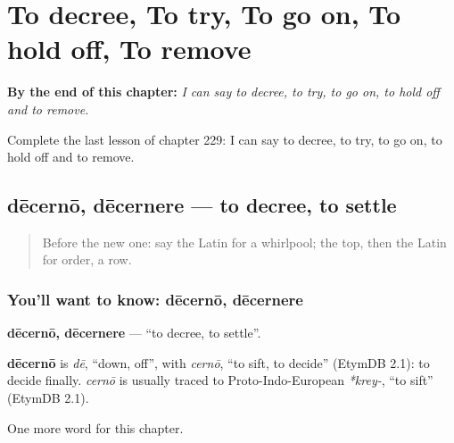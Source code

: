 
\chapter{To decree, To try, To go on, To hold off, To remove}
\label{ch:la-to-decree-to-try-to-go-on-to-hold-off-to-remove}

\begin{chapteropening}
\textbf{By the end of this chapter:} \emph{I can say to decree, to try, to go on, to hold off and to remove.}

Complete the last lesson of chapter 229: I can say to decree, to try, to go on, to hold off and to remove.
\end{chapteropening}

\section[dēcernō, dēcernere]{dēcernō, dēcernere — to decree, to settle}

\label{lesson:LA-C229-decerno}



\begin{quote}
Before the new one: say the Latin for a whirlpool; the top, then the Latin for order, a row.
\end{quote}

\subsection*{You'll want to know: dēcernō, dēcernere}
\textbf{dēcernō, dēcernere} — \textquotedblleft{}to decree, to settle\textquotedblright{}.

\begin{cousinweb}
\textbf{dēcernō} is \emph{dē}, \textquotedblleft{}down, off\textquotedblright{}, with \emph{cernō}, \textquotedblleft{}to sift, to decide\textquotedblright{} (EtymDB 2.1): to decide finally. \emph{cernō} is usually traced to Proto-Indo-European \emph{*krey-}, \textquotedblleft{}to sift\textquotedblright{} (EtymDB 2.1).
\end{cousinweb}

\begin{grammarlens}[title={What you've built}]
One more word for this chapter.
\end{grammarlens}

